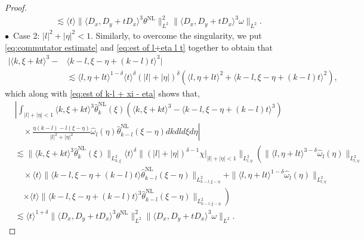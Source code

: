\documentclass[reqno, 12pt]{amsart} %
\theoremstyle{plain} %
\theoremstyle{definition}
\theoremstyle{remark}
\numberwithin{equation}{section} %
\newcommand{\lt}{\left}
\newcommand{\rt}{\right}
\begin{document}
\begin{proof}
\begin{equation}
\begin{aligned}
				& \lesssim\langle t\rangle\|\langle D_x, D_y+t D_x\rangle^3 \theta^{\mathrm{NL}}\|_{L^2}^2\|\langle D_x, D_y+t D_x\rangle^3 \omega\|_{L^2} .
			\end{aligned}
		\end{equation}
		$\bullet$~Case 2: $|l|^2+|\eta|^2<1$. Similarly, to overcome the singularity, we put \eqref{eq:commutator estimate} and \eqref{eq:est of l+eta l t} together to obtain that
		\begin{equation*}\begin{aligned}
				|\langle k, \xi+k t\rangle^3- &\langle k-l, \xi-\eta+(k-l) t\rangle^3|  \\
				& \lesssim \langle l, \eta+l t\rangle^{1-\delta}\langle t\rangle^\delta(|l|+|\eta|)^\delta   \left(\langle l, \eta+l t\rangle^2+\langle k-l, \xi-\eta+(k-l) t\rangle^2\right),
		\end{aligned}\end{equation*}
		which along with \eqref{eq:est of k-l + xi - eta} shows that,
		\begin{equation}
			\begin{aligned} \label{eq:temp.3}
				&  \lt| \int_{|l|+|\eta|<1}\langle k, \xi+k t\rangle^3 \hat{\theta}_k^{\mathrm{NL}}(\xi)\left(\langle k, \xi+k t\rangle^3-\langle k-l, \xi-\eta+(k-l) t\rangle^3\right)\rt. \\
				& \left.\quad \times \frac{\eta(k-l)-l(\xi-\eta)}{|l|^2+|\eta|^2} \hat{\omega}_l(\eta) \hat{\theta}_{k-l}^{\mathrm{NL}}(\xi-\eta) d k d l d \xi d \eta \right| \\
				& \lesssim\|\langle k, \xi+k t\rangle^3 \hat{\theta}_k^{\mathrm{NL}}(\xi)\|_{L_{k, \xi}^2}   \langle t\rangle^\delta      \|( | l | + | \eta | ) ^ { \delta - 1 } \lt. \chi \rt|_{ | l|+|\eta|<1} \|_{L_{l, \eta}^2} \lt(   \|\langle l, \eta+l t\rangle^{3-\delta} \hat{\omega}_l(\eta)\|_{L_{l, \eta}^2}   \rt. \\
				& \lt. \quad \times\langle t\rangle\|\langle k-l, \xi-\eta+(k-l) t\rangle \hat{\theta}_{k-l}^{\mathrm{NL}}(\xi-\eta)\|_{L_{k-l, \xi-\eta}^2}  +  \|\langle l, \eta+l t\rangle^{1-\delta} \hat{\omega}_l(\eta)\|_{L_{l, \eta}^2} \rt.\\
				&\quad \lt.  \times\langle t\rangle\|\langle k-l, \xi-\eta+(k-l) t\rangle^3 \hat{\theta}_{k-l}^{\mathrm{NL}}(\xi-\eta)\|_{L_{k-l, \xi-\eta}^2} \rt)\\
				& \lesssim\langle t\rangle^{1+\delta}\|\langle D_x, D_y+t D_x\rangle^3 \theta^{\mathrm{NL}}\|_{L^2}^2\|\langle D_x, D_y+t D_x\rangle^3 \omega\|_{L^2}.
			\end{aligned}
		\end{equation}
		

\end{proof}
\end{document}
